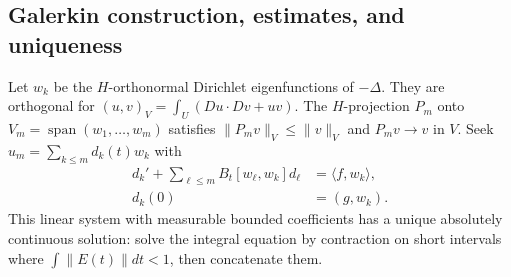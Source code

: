\subsection{Galerkin construction, estimates, and uniqueness}
Let $w_k$ be the $H$-orthonormal Dirichlet eigenfunctions of $-\Delta$.
They are orthogonal for $(u,v)_V=\int_U(Du\cdot Dv+uv)$.
The $H$-projection $P_m$ onto $V_m=\operatorname{span}(w_1,\ldots,w_m)$
satisfies $\|P_m v\|_V\leq\|v\|_V$ and $P_m v\to v$ in $V$.
Seek $u_m=\sum_{k\leq m}d_k(t)w_k$ with
\begin{equation}\label{eq:7-galerkin}
 \begin{split}
 d_k'+\sum_{\ell\leq m}B_t[w_\ell,w_k]d_\ell&=\langle f,w_k\rangle,\\
 d_k(0)&=(g,w_k).
 \end{split}
\end{equation}
This linear system with measurable bounded coefficients has a unique
absolutely continuous solution: solve the integral equation by contraction
on short intervals where $\int\|E(t)\|dt<1$, then concatenate them.

